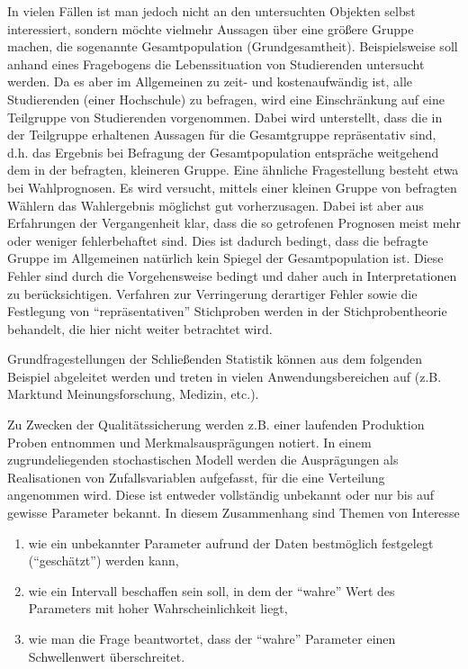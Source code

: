 \documentclass{lecture}
\begin{document}
    In vielen Fällen ist man jedoch nicht an den untersuchten Objekten selbst interessiert, sondern möchte vielmehr Aussagen über eine größere Gruppe machen, die sogenannte Gesamtpopulation (Grundgesamtheit).
    Beispielsweise soll anhand eines Fragebogens die Lebenssituation von Studierenden untersucht werden.
    Da es aber im Allgemeinen zu zeit- und kostenaufwändig ist, alle Studierenden (einer Hochschule) zu befragen, wird eine Einschränkung auf eine Teilgruppe von Studierenden vorgenommen.
    Dabei wird unterstellt, dass die in der Teilgruppe erhaltenen Aussagen für die Gesamtgruppe repräsentativ sind, d.h. das Ergebnis bei Befragung der Gesamtpopulation entspräche weitgehend dem in der befragten, kleineren Gruppe.
    Eine ähnliche Fragestellung besteht etwa bei Wahlprognosen.
    Es wird versucht, mittels einer kleinen Gruppe von befragten Wählern das Wahlergebnis möglichst gut vorherzusagen.
    Dabei ist aber aus Erfahrungen der Vergangenheit klar, dass die so getrofenen Prognosen meist mehr oder weniger fehlerbehaftet sind.
    Dies ist dadurch bedingt, dass die befragte Gruppe im Allgemeinen natürlich kein Spiegel der Gesamtpopulation ist.
    Diese Fehler sind durch die Vorgehensweise bedingt und daher auch in Interpretationen zu berücksichtigen.
    Verfahren zur Verringerung derartiger Fehler sowie die Festlegung von ``repräsentativen'' Stichproben werden in der Stichprobentheorie behandelt, die hier nicht weiter betrachtet wird.
    
    Grundfragestellungen der Schließenden Statistik können aus dem folgenden Beispiel abgeleitet werden und treten in vielen Anwendungsbereichen auf (z.B. Marktund Meinungsforschung, Medizin, etc.).

    \begin{example}
        Zu Zwecken der Qualitätssicherung werden z.B. einer laufenden Produktion Proben entnommen und Merkmalsausprägungen notiert.
        In einem zugrundeliegenden stochastischen Modell werden die Ausprägungen als Realisationen von Zufallsvariablen aufgefasst, für die eine Verteilung angenommen wird.
        Diese ist entweder vollständig unbekannt oder nur bis auf gewisse Parameter bekannt.
        In diesem Zusammenhang sind Themen von Interesse
        \begin{enumerate}
            \item wie ein unbekannter Parameter aufrund der Daten bestmöglich festgelegt (``geschätzt'') werden kann,
            \item wie ein Intervall beschaffen sein soll, in dem der ``wahre'' Wert des Parameters mit hoher Wahrscheinlichkeit liegt,
            \item wie man die Frage beantwortet, dass der ``wahre'' Parameter einen Schwellenwert überschreitet.
        \end{enumerate}
    \end{example}
\end{document}

